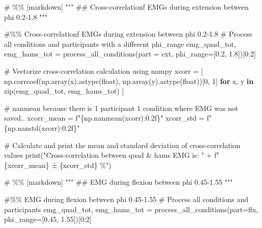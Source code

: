 \documentclass[
  11pt,
  a4paper]{article}
\newenvironment{Shaded}{\begin{snugshade}}{\end{snugshade}}
\newcommand{\BuiltInTok}[1]{\textcolor[rgb]{0.00,0.23,0.31}{#1}}
\newcommand{\CommentTok}[1]{\textcolor[rgb]{0.37,0.37,0.37}{#1}}
\newcommand{\ControlFlowTok}[1]{\textcolor[rgb]{0.00,0.23,0.31}{\textbf{#1}}}
\newcommand{\DecValTok}[1]{\textcolor[rgb]{0.68,0.00,0.00}{#1}}
\newcommand{\FloatTok}[1]{\textcolor[rgb]{0.68,0.00,0.00}{#1}}
\newcommand{\KeywordTok}[1]{\textcolor[rgb]{0.00,0.23,0.31}{\textbf{#1}}}
\newcommand{\NormalTok}[1]{\textcolor[rgb]{0.00,0.23,0.31}{#1}}
\newcommand{\OperatorTok}[1]{\textcolor[rgb]{0.37,0.37,0.37}{#1}}
\newcommand{\SpecialCharTok}[1]{\textcolor[rgb]{0.37,0.37,0.37}{#1}}
\newcommand{\SpecialStringTok}[1]{\textcolor[rgb]{0.13,0.47,0.30}{#1}}
\newcommand{\StringTok}[1]{\textcolor[rgb]{0.13,0.47,0.30}{#1}}
\begin{document}
\begin{Shaded}
\begin{Highlighting}[]
\CommentTok{\# \%\% [markdown]}
\CommentTok{"""}
\CommentTok{\#\# Cross{-}correlationf EMGs during extension between phi 0.2{-}1.8}
\CommentTok{"""}

\CommentTok{\#\%\% Cross{-}correlationf EMGs during extension between phi 0.2{-}1.8}
\CommentTok{\# Process all conditions and participants with a different phi\_range}
\NormalTok{emg\_quad\_tot, emg\_hams\_tot }\OperatorTok{=}\NormalTok{ process\_all\_conditions(part }\OperatorTok{=} \StringTok{\textquotesingle{}ext\textquotesingle{}}\NormalTok{, phi\_range}\OperatorTok{=}\NormalTok{[}\FloatTok{0.2}\NormalTok{, }\FloatTok{1.8}\NormalTok{])[}\DecValTok{0}\NormalTok{:}\DecValTok{2}\NormalTok{]}

\CommentTok{\# Vectorize cross{-}correlation calculation using numpy}
\NormalTok{xcorr }\OperatorTok{=}\NormalTok{ [}
\NormalTok{    np.corrcoef(np.array(x).astype(}\BuiltInTok{float}\NormalTok{), np.array(y).astype(}\BuiltInTok{float}\NormalTok{))[}\DecValTok{0}\NormalTok{, }\DecValTok{1}\NormalTok{]}
    \ControlFlowTok{for}\NormalTok{ x, y }\KeywordTok{in} \BuiltInTok{zip}\NormalTok{(emg\_quad\_tot, emg\_hams\_tot)}
\NormalTok{]}

\CommentTok{\# nanmean because there is 1 participant 1 condition where EMG was not saved..}
\NormalTok{xcorr\_mean }\OperatorTok{=} \SpecialStringTok{f"}\SpecialCharTok{\{}\NormalTok{np}\SpecialCharTok{.}\NormalTok{nanmean(xcorr)}\SpecialCharTok{:0.2f\}}\SpecialStringTok{"}
\NormalTok{xcorr\_std  }\OperatorTok{=} \SpecialStringTok{f"}\SpecialCharTok{\{}\NormalTok{np}\SpecialCharTok{.}\NormalTok{nanstd(xcorr)}\SpecialCharTok{:0.2f\}}\SpecialStringTok{"}

\CommentTok{\# Calculate and print the mean and standard deviation of cross{-}correlation values}
\BuiltInTok{print}\NormalTok{(}\StringTok{"Cross{-}correlation between quad \& hams EMG is: "} \OperatorTok{+} 
      \SpecialStringTok{f"}\SpecialCharTok{\{}\NormalTok{xcorr\_mean}\SpecialCharTok{\}}\SpecialStringTok{ ± }\SpecialCharTok{\{}\NormalTok{xcorr\_std}\SpecialCharTok{\}}\SpecialStringTok{ \%"}\NormalTok{)}

\CommentTok{\# \%\% [markdown]}
\CommentTok{"""}
\CommentTok{\#\# EMG during flexion between phi 0.45{-}1.55}
\CommentTok{"""}

\CommentTok{\#\%\% EMG during flexion between phi 0.45{-}1.55}
\CommentTok{\# Process all conditions and participants}
\NormalTok{emg\_quad\_tot, emg\_hams\_tot }\OperatorTok{=}\NormalTok{ process\_all\_conditions(part}\OperatorTok{=}\StringTok{\textquotesingle{}flx\textquotesingle{}}\NormalTok{, phi\_range}\OperatorTok{=}\NormalTok{[}\FloatTok{0.45}\NormalTok{, }\FloatTok{1.55}\NormalTok{])[}\DecValTok{0}\NormalTok{:}\DecValTok{2}\NormalTok{]}


\end{Highlighting}
\end{Shaded}
\end{document}
